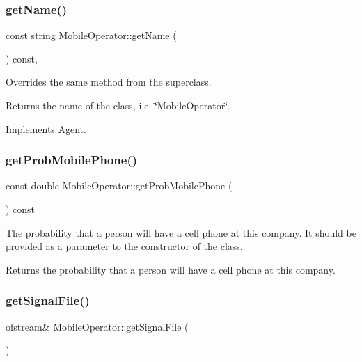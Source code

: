 \subsubsection{\texorpdfstring{getName()}{getName()}}
{\footnotesize\ttfamily const string Mobile\+Operator\+::get\+Name (\begin{DoxyParamCaption}{ }\end{DoxyParamCaption}) const\hspace{0.3cm}{\ttfamily [override]}, {\ttfamily [virtual]}}

Overrides the same method from the superclass. \begin{DoxyReturn}{Returns}
the name of the class, i.\+e. \char`\"{}\+Mobile\+Operator\char`\"{}. 
\end{DoxyReturn}


Implements \mbox{\hyperlink{class_agent_afe6c72d91baf9ee4fe77ea1ed7fef3ba}{Agent}}.

\mbox{\label{class_mobile_operator_afe59edb4ba22cea7fab968fdd1e2ce31}} 
\subsubsection{\texorpdfstring{getProbMobilePhone()}{getProbMobilePhone()}}
{\footnotesize\ttfamily const double Mobile\+Operator\+::get\+Prob\+Mobile\+Phone (\begin{DoxyParamCaption}{ }\end{DoxyParamCaption}) const}

The probability that a person will have a cell phone at this company. It should be provided as a parameter to the constructor of the class. \begin{DoxyReturn}{Returns}
the probability that a person will have a cell phone at this company. 
\end{DoxyReturn}
\mbox{\label{class_mobile_operator_ac39217182fd0ce7ef5da3b9018bcb965}} 
\subsubsection{\texorpdfstring{getSignalFile()}{getSignalFile()}}
{\footnotesize\ttfamily ofstream\& Mobile\+Operator\+::get\+Signal\+File (\begin{DoxyParamCaption}{ }\end{DoxyParamCaption})}


